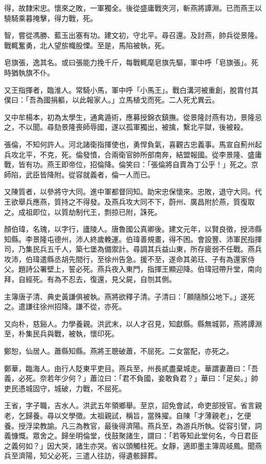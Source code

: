 \begin{pinyinscope}
得，故隸宋忠。懷來之敗，一軍獨全。後從盛庸戰夾河，斬燕將譚淵。已而燕王以驍騎乘暮掩擊，得力戰，死。

智，嘗從馮勝、藍玉出塞有功。建文初，守北平。尋召還。及討燕，帥兵從景隆。戰輒奮勇，北人望旂幟股慄。至是，馬陷被執，死。

皂旗張，逸其名。或曰張能力挽千斤，每戰輒麾皂旗先驅，軍中呼「皂旗張」。死時猶執旗不仆。

又王指揮者，臨淮人。常騎小馬，軍中呼「小馬王」。戰白溝河被重創，脫胄付其僕曰：「吾為國捐軀，以此報家人。」立馬植戈而死。二人死尤異云。

又中牟楊本，初為太學生，通禽遁術，應募授錦衣鎮撫。從景隆討燕有功，景隆忌之，不以聞。尋劾景隆喪師辱國，遂以孤軍獨出，被擒，繫北平獄，後被殺。

張倫，不知何許人。河北諸衛指揮使也，勇悍負氣，喜觀古忠義事。馬宣自薊州起兵攻北平，不克，死。倫發憤，合兩衛官帥所部南奔，結盟報國。從李景隆、盛庸戰，皆有功。燕王即帝位，招倫降。倫笑曰：「張倫將自賣為丁公乎！」死之。京師陷，武臣皆降附。從容就義者，倫一人而已。

又陳質者，以參將守大同。進中軍都督同知。助宋忠保懷來。忠敗，退守大同。代王欲舉兵應燕，質持之不得發。及燕兵攻大同不下，蔚州、廣昌附於燕，質復取之。成祖即位，以質劫制代王，剽掠已附，誅死。

顏伯瑋，名瑰，以字行，廬陵人。唐魯國公真卿後。建文元年，以賢良徵，授沛縣知縣。李景隆屯德州，沛人終歲輓運。伯瑋善規畫，得不困。會設豐、沛軍民指揮司，乃集民兵五千人，築七堡為備禦計。尋調其兵益山東，所存疲弱不任戰。燕兵攻沛，伯瑋遣縣丞胡先間行，至徐州告急。援不至，遂命其弟玨、子有為還家侍父。題詩公署壁上，誓必死。燕兵夜入東門，指揮王顯迎降。伯瑋冠帶升堂，南向拜，自經死。有為不忍去，復還，見父屍，自刎其側。

主簿唐子清、典史黃謙俱被執。燕將欲釋子清。子清曰：「願隨顏公地下。」遂死之。遣謙往徐州招降。謙不從，亦死。

又向朴，慈谿人。力學養親。洪武末，以人才召見，知獻縣。縣無城郭，燕將譚淵至，朴集民兵與戰，被執，懷印死。

鄭恕，仙居人。蕭縣知縣。燕將王聰破蕭，不屈死。二女當配，亦死之。

鄭華，臨海人。由行人貶東平吏目。燕兵至，州長貳盡棄城走。華謂妻蕭曰：「吾義，必死。奈若年少何？」蕭泣曰：「君不負國，妾敢負君？」華曰：「足矣。」帥吏民憑城固守，城破，力戰，不屈死。

王省，字子職，吉水人。洪武五年領鄉舉。至京，詔免會試，命吏部授官。省言親老，乞歸養。尋以文學徵。太祖親試，稱旨，當殊擢。自陳「才薄親老」，乞便養。授浮梁教諭。凡三為教官，最後得濟陽。燕兵至，為游兵所執。從容引譬，詞義慷慨。眾舍之。歸坐明倫堂，伐鼓聚諸生，謂曰：「若等知此堂何名，今日君臣之義何如？」因大哭，諸生亦哭。省以頭觸柱死。女靜，適即墨主簿周岐鳳。聞燕兵至濟陽，知父必死，三遣人往訪，得遺骸歸葬。


\end{pinyinscope}
